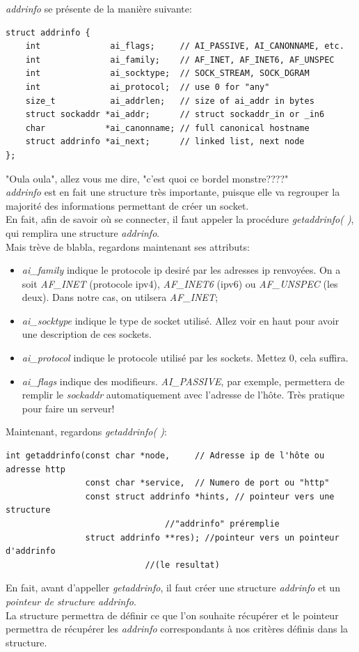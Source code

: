 \documentclass{report}
\begin{document}
\emph{addrinfo} se présente de la manière suivante:
\begin{lstlisting}
struct addrinfo {
    int              ai_flags;     // AI_PASSIVE, AI_CANONNAME, etc.
    int              ai_family;    // AF_INET, AF_INET6, AF_UNSPEC
    int              ai_socktype;  // SOCK_STREAM, SOCK_DGRAM
    int              ai_protocol;  // use 0 for "any"
    size_t           ai_addrlen;   // size of ai_addr in bytes
    struct sockaddr *ai_addr;      // struct sockaddr_in or _in6
    char            *ai_canonname; // full canonical hostname
    struct addrinfo *ai_next;      // linked list, next node
};
\end{lstlisting}
"Oula oula", allez vous me dire, "c'est quoi ce bordel monstre????"\\
\emph{addrinfo} est en fait une structure très importante, puisque elle va regrouper la majorité des informations permettant de créer un socket.\\
En fait, afin de savoir où se connecter, il faut appeler la procédure \emph{getaddrinfo( )}, qui remplira une structure \emph{addrinfo}.\\
Mais trève de blabla, regardons maintenant ses attributs:
\begin{itemize}
\item{\emph{ai\_family} indique le protocole ip desiré par les adresses ip renvoyées. On a soit \emph{AF\_INET} (protocole ipv4), \emph{AF\_INET6} (ipv6) ou \emph{AF\_UNSPEC} (les deux).
Dans notre cas, on utilsera \emph{AF\_INET};}
\item{\emph{ai\_socktype} indique le type de socket utilisé. Allez voir en haut pour avoir une description de ces sockets.}
\item{\emph{ai\_protocol} indique le protocole utilisé par les sockets. Mettez 0, cela suffira.}
\item{\emph{ai\_flags} indique des modifieurs. \emph{AI\_PASSIVE}, par exemple, permettera de remplir le \emph{sockaddr} automatiquement avec l'adresse de l'hôte. Très pratique pour faire un serveur!}
\end{itemize}

Maintenant, regardons \emph{getaddrinfo( )}:
\begin{lstlisting}
int getaddrinfo(const char *node,     // Adresse ip de l'hôte ou adresse http
                const char *service,  // Numero de port ou "http"
                const struct addrinfo *hints, // pointeur vers une structure 
                				//"addrinfo" préremplie
                struct addrinfo **res); //pointeur vers un pointeur d'addrinfo 
                			//(le resultat)
\end{lstlisting}
En fait, avant d'appeller \emph{getaddrinfo}, il faut créer une structure \emph{addrinfo} et un \emph{pointeur de structure addrinfo}.\\
La structure permettra de définir ce que l'on souhaite récupérer et le pointeur permettra de récupérer les \emph{addrinfo} correspondants à nos critères définis dans la structure.
\end{document}
